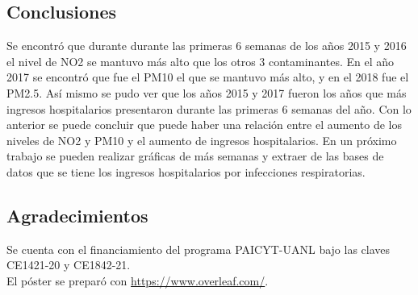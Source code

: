 \documentclass[a0]{sciposter} %
\begin{document}
\begin{multicols}{2}
\section{Conclusiones}
Se encontró que durante durante las primeras 6 semanas de los años 2015 y 2016 el nivel de NO2 se mantuvo más alto que los otros 3 contaminantes. En el año 2017 se encontró que fue el PM10 el que se mantuvo más alto, y en el 2018 fue el PM2.5. Así mismo se pudo ver que los años 2015 y 2017 fueron los años que más ingresos hospitalarios presentaron durante las primeras 6 semanas del año. 
Con lo anterior se puede concluir que puede haber una relación entre el aumento de los niveles de NO2 y PM10 y el aumento de ingresos hospitalarios.
En un próximo trabajo se pueden realizar gráficas de más semanas y extraer de las bases de datos que se tiene los ingresos hospitalarios por infecciones respiratorias.

\subsection*{Agradecimientos}

Se cuenta con el financiamiento del programa PAICYT-UANL bajo las claves CE1421-20 y CE1842-21.\\
El póster se preparó con \url{https://www.overleaf.com/}.



    
\end{multicols}
\end{document}

